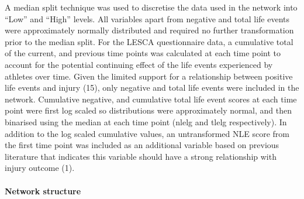 \documentclass[
  english,
  man]{apa6}
\let\oldparagraph\paragraph
\renewcommand{\paragraph}[1]{\oldparagraph{#1}\mbox{}}
\begin{document}
A median split technique was used to discretise the data used in the network into ``Low'' and ``High'' levels.
All variables apart from negative and total life events were approximately normally distributed and required no further transformation prior to the median split.
For the LESCA questionnaire data, a cumulative total of the current, and previous time points was calculated at each time point to account for the potential continuing effect of the life events experienced by athletes over time.
Given the limited support for a relationship between positive life events and injury (15), only negative and total life events were included in the network.
Cumulative negative, and cumulative total life event scores at each time point were first log scaled so distributions were approximately normal, and then binarised using the median at each time point (nlelg and tlelg respectively).
In addition to the log scaled cumulative values, an untransformed NLE score from the first time point was included as an additional variable based on previous literature that indicates this variable should have a strong relationship with injury outcome (1).

\hypertarget{network-structure}{%
\paragraph{Network structure}\label{network-structure}}
\end{document}
